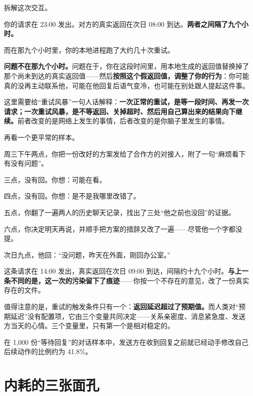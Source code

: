 拆解这次交互。

你的请求在 23:00 发出。对方的真实返回在次日 08:00 到达。\textbf{两者之间隔了九个小时。}

而在那九个小时里，你的本地进程跑了大约几十次重试。

\textbf{问题不在那九个小时。}问题在于，你在这段时间里，用本地生成的返回值替换掉了那个尚未到达的真实返回值——然后\textbf{按照这个假返回值，调整了你的行为}：你可能真的没再主动联系他，可能在他回复后语气变冷，也可能在别处跟人提起这件事。

这里需要给“重试风暴”一句人话解释：\textbf{一次正常的重试，是等一段时间、再发一次请求；一次重试风暴，是不等返回、关掉超时、然后用自己算出来的结果向下继续。}前者改变的是网络上发生的事情，后者改变的是你脑子里发生的事情。

再看一个更平常的样本。

\par
\begin{mdquote}
周三下午两点，你把一份改好的方案发给了合作方的对接人，附了一句“麻烦看下有没有问题”。\par
\vspace{0.3\baselineskip}
三点，没有回。你想：可能在看。\par
\vspace{0.3\baselineskip}
四点，没有回。你想：是不是我哪里改错了。\par
\vspace{0.3\baselineskip}
五点，你翻了一遍两人的历史聊天记录，找出了三处“他之前也没回”的证据。\par
\vspace{0.3\baselineskip}
六点，你决定明天再说，并顺手把方案的措辞又改了一遍——尽管他一个字都没提。\par
\vspace{0.3\baselineskip}
次日九点，他回：“没问题，昨天在外面，刚回办公室。”
\end{mdquote}

这条请求在 14:00 发出，真实返回在次日 09:00 到达，间隔约十九个小时。\textbf{与上一条不同的是，这一次的污染留下了痕迹}——你按一个不存在的意见，改了一份真实存在的文件。

值得注意的是，重试的触发条件只有一个：\textbf{返回延迟超过了预期值。}而人类对“预期延迟”没有配置项，它由三个变量共同决定——关系亲密度、消息紧急度、发送方当天的心情。三个变量里，只有第一个是相对稳定的。

在 1,000 份“等待回复”的对话样本中，发送方在收到回复之前就已经动手修改自己后续动作的比例约为 41.8\%。

\section{内耗的三张面孔}

